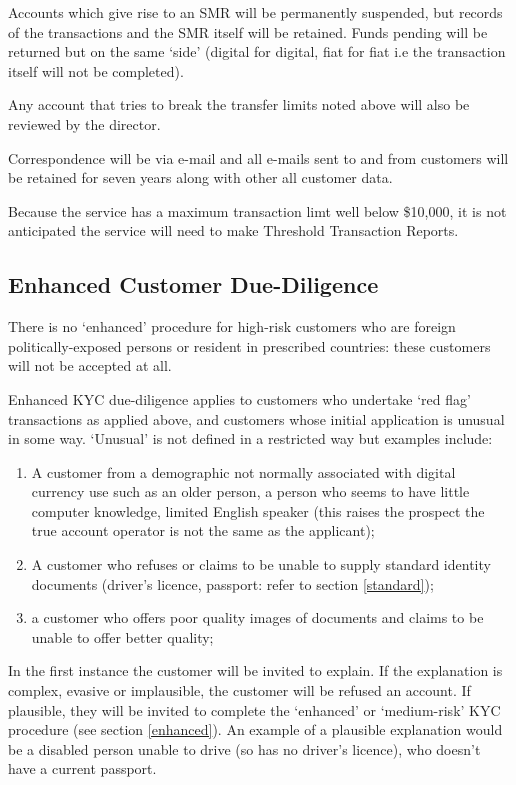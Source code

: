 \documentclass[12pt]{report}
\begin{document}
Accounts which give rise to an SMR will be permanently suspended, but records of the transactions and the SMR itself will be retained. Funds
pending will be returned but on the same `side' (digital for digital, fiat for fiat i.e the transaction itself will not be completed).

Any account that tries to break the transfer limits noted above will also be reviewed by the director.

Correspondence will be via e-mail and all e-mails sent to and from customers will be retained for seven years along with other all customer data.

Because the service has a maximum transaction limt well below \$10,000, it is not anticipated the service will need to make Threshold Transaction
Reports.

\subsection{Enhanced Customer Due-Diligence} \label{red-flags}

There is no `enhanced' procedure for high-risk customers who are foreign politically-exposed persons or resident in prescribed countries:
these customers will not be accepted at all.

Enhanced KYC due-diligence applies to customers who undertake `red flag' transactions as applied above, and customers whose initial
application is unusual in some way. `Unusual' is not defined in a restricted way but examples include:
\begin{enumerate}
\item A customer from a demographic not normally associated with digital currency use
  such as an older person, a person who seems to have little computer knowledge,
  limited English speaker (this raises the prospect the true account operator is not the same as the applicant);
\item A customer who refuses or claims to be unable to supply standard identity documents (driver's licence, passport: refer to section
  \ref{standard});
\item a customer who offers poor quality images of documents and claims to be unable to offer better quality;
\end{enumerate}

In the first instance the customer will be invited to explain. If the explanation is complex, evasive or implausible, the customer will be
refused an account. If plausible, they will be invited to complete the `enhanced' or `medium-risk' KYC procedure (see section \ref{enhanced}).
An example of a plausible explanation would be a disabled person unable to drive (so has no driver's licence), who doesn't have a current passport.
\end{document}
